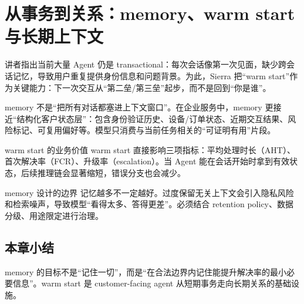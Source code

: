 \section{从事务到关系：memory、warm start 与长期上下文}

讲者指出当前大量 Agent 仍是 transactional：每次会话像第一次见面，缺少跨会话记忆，导致用户重复提供身份信息和问题背景。为此，Sierra 把“warm start”作为关键能力：下一次交互从“第二垒/第三垒”起步，而不是回到“你是谁”。

memory 不是“把所有对话都塞进上下文窗口”。在企业服务中，memory 更接近“结构化客户状态层”：包含身份验证历史、设备/订单状态、近期交互结果、风险标记、可复用偏好等。模型只消费与当前任务相关的“可证明有用”片段。

\begin{importantbox}{warm start 的业务价值}
warm start 直接影响三项指标：平均处理时长（AHT）、首次解决率（FCR）、升级率（escalation）。当 Agent 能在会话开始时拿到有效状态，后续推理链会显著缩短，错误分支也会减少。
\end{importantbox}

\begin{warningbox}{memory 设计的边界}
记忆越多不一定越好。过度保留无关上下文会引入隐私风险和检索噪声，导致模型“看得太多、答得更差”。必须结合 retention policy、数据分级、用途限定进行治理。
\end{warningbox}

\subsection{本章小结}

memory 的目标不是“记住一切”，而是“在合法边界内记住能提升解决率的最小必要信息”。warm start 是 customer-facing agent 从短期事务走向长期关系的基础设施。

